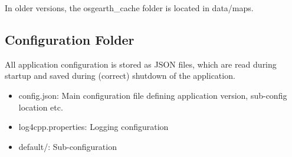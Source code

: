 In older versions, the osgearth\_cache folder is located in data/maps.

\subsection{Configuration Folder}
\label{sec:appendix_config_config_folder}

All application configuration is stored as JSON files, which are read during startup and saved during (correct) shutdown of the application.


\begin{itemize}
\item config.json: Main configuration file defining application version, sub-config location etc.
\item log4cpp.properties: Logging configuration
\item default/: Sub-configuration

\end{itemize}
